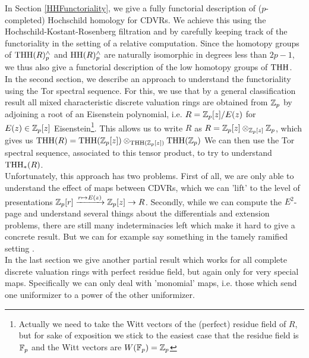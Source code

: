 In Section \ref{HHFunctoriality}, we give a fully functorial description of ($p$-completed) Hochschild homology for CDVRs. We achieve this using the Hochschild-Kostant-Rosenberg filtration and by carefully keeping track of the functoriality in the setting of a relative computation. Since the homotopy groups of $\operatorname{THH}(R)_p^{\wedge}$ and $\operatorname{HH}(R)_p^{\wedge}$ are naturally isomorphic in degrees less than $2p-1$, we thus also give a functorial description of the low homotopy groups of $\operatorname{THH}$.\\
In the second section, we describe an approach to understand the functoriality using the Tor spectral sequence. 
For this, we use that by a general classification result all mixed characteristic discrete valuation rings are obtained from $\mathbb{Z}_p$ by adjoining a root of an Eisenstein polynomial, i.e. $R=\mathbb{Z}_p[z]/E(z)$ for $E(z)\in \mathbb{Z}_p[z]$ Eisenstein\footnote{Actually we need to take the Witt vectors of the (perfect) residue field of $R$, but for sake of exposition we stick to the easiest case that the residue field is $\mathbb{F}_p$ and the Witt vectors are $W(\mathbb{F}_p)=\mathbb{Z}_p$}. 
This allows us to write $R$ as $R=\mathbb{Z}_p[z]\otimes_{\mathbb{Z}_p[z]}\mathbb{Z}_p$, which gives us $\operatorname{THH}(R)=\operatorname{THH}(\mathbb{Z}_p[z])\otimes_{\operatorname{THH}(\mathbb{Z}_p[z])}\operatorname{THH}(\mathbb{Z}_p)$
We can then use the Tor spectral sequence, associated to this tensor product, to try to understand $\operatorname{THH}_*(R)$.  \\
Unfortunately, this approach has two problems. First of all, we are only able to understand the effect of maps between CDVRs, which we can 'lift' to the level of presentations $\mathbb{Z}_p[r]\xrightarrow{r\mapsto E(z)} \mathbb{Z}_p[z]\rightarrow R$. Secondly, while we can compute the $E^2$-page and understand several things about the differentials and extension problems, there are still many indeterminacies left which make it hard to give a concrete result. But we can for example say something in the tamely ramified setting .\\
In the last section we give another partial result which works for all complete discrete valuation rings with perfect residue field, but again only for very special maps. Specifically we can only deal with 'monomial' maps, i.e. those which send one uniformizer to a power of the other uniformizer. 


